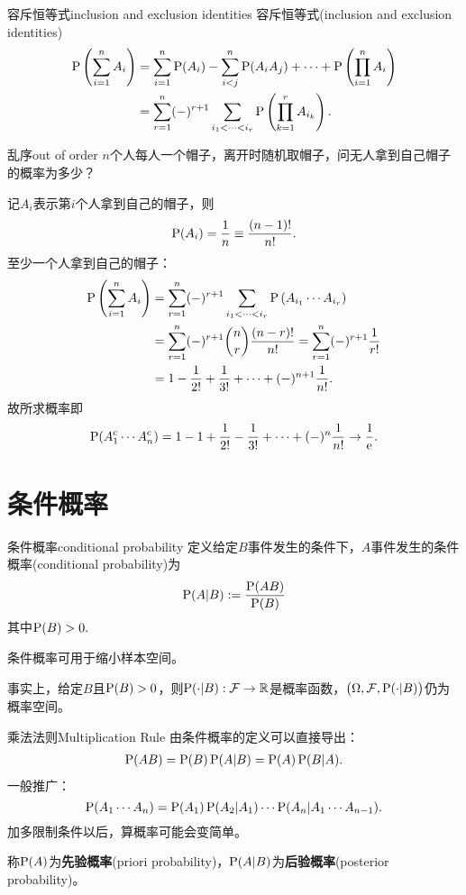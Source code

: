 \begin{theorem}{容斥恒等式}{inclusion and exclusion identities}
	容斥恒等式(inclusion and exclusion identities)
	\begin{align}\notag
		\P\kh{\sum_{i=1}^nA_i}&=\sum_{i=1}^n\P(A_i)-\sum_{i<j}^n\P(A_iA_j)+\cdots+\P\kh{\prod_{i=1}^nA_i}\\
		&=\sum_{r=1}^n(-)^{r+1}\sum_{i_1<\cdots<i_r}\P\kh{\prod_{k=1}^rA_{i_k}}.
	\end{align}
\end{theorem}
\begin{example}{乱序}{out of order}
	$n$个人每人一个帽子，离开时随机取帽子，问无人拿到自己帽子的概率为多少？

	记$A_i$表示第$i$个人拿到自己的帽子，则
	\[
		\P(A_i)=\frac1n\equiv\frac{(n-1)!}{n!}.
	\]
	至少一个人拿到自己的帽子：
	\begin{align*}
		\P\kh{\sum_{i=1}^nA_i}&=\sum_{r=1}^n(-)^{r+1}\sum_{i_1<\cdots<i_r}\P\kh{A_{i_1}\cdots A_{i_r}}\\
		&=\sum_{r=1}^n(-)^{r+1}\binom nr\frac{(n-r)!}{n!}=\sum_{r=1}^n(-)^{r+1}\frac1{r!}\\
		&=1-\frac1{2!}+\frac1{3!}+\cdots+(-)^{n+1}\frac1{n!}.
	\end{align*}
	故所求概率即
	\[
		\P(A_1\c\cdots A_n\c)=1-1+\frac1{2!}-\frac1{3!}+\cdots+(-)^n\frac1{n!}\to\frac1{\e{}}.
	\]
\end{example}
\section{条件概率}
\begin{definition}{条件概率}{conditional probability}
	定义给定$B$事件发生的条件下，$A$事件发生的条件概率(conditional probability)为
	\begin{align}
		\P(A|B):=\frac{\P(AB)}{\P(B)}
	\end{align}
	其中$\P(B)>0.$
\end{definition}
条件概率可用于缩小样本空间。

事实上，给定$B$且$\P(B)>0$，则$\P(\cdot|B):\cF\to\RR$是概率函数，$\bigkh{\Omega,\cF,\P(\cdot|B)}$仍为概率空间。
\begin{theorem}{乘法法则}{Multiplication Rule}
	由条件概率的定义可以直接导出：
	\begin{align}
		\P(AB)=\P(B)\P(A|B)=\P(A)\P(B|A).
	\end{align}
	一般推广：
	\[
		\P(A_1\cdots A_n)=\P(A_1)\P(A_2|A_1)\cdots\P(A_n|A_1\cdots A_{n-1}).
	\]
	加多限制条件以后，算概率可能会变简单。
\end{theorem}
称$\P(A)$为\textbf{先验概率}(priori probability)，$\P(A|B)$为\textbf{后验概率}(posterior probability)。

